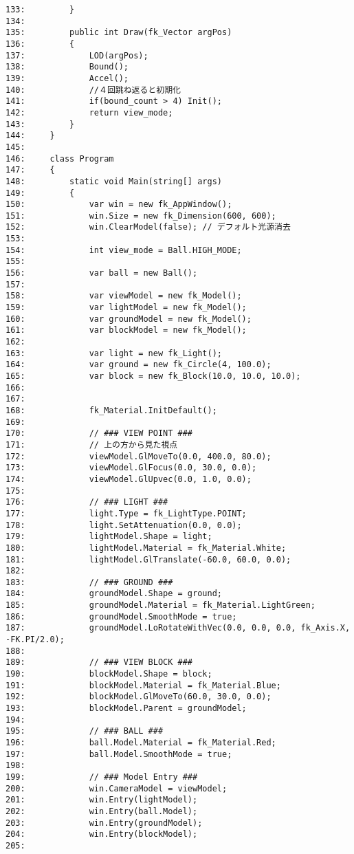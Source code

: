 \begin{breakbox}
\begin{small}
\begin{verbatim}
133:         }
134: 
135:         public int Draw(fk_Vector argPos)
136:         {
137:             LOD(argPos);
138:             Bound();
139:             Accel();
140:             //４回跳ね返ると初期化
141:             if(bound_count > 4) Init();
142:             return view_mode;
143:         }
144:     }
145: 
146:     class Program
147:     {
148:         static void Main(string[] args)
149:         {
150:             var win = new fk_AppWindow();
151:             win.Size = new fk_Dimension(600, 600);
152:             win.ClearModel(false); // デフォルト光源消去
153: 
154:             int view_mode = Ball.HIGH_MODE;
155:     
156:             var ball = new Ball();
157:             
158:             var viewModel = new fk_Model();
159:             var lightModel = new fk_Model();
160:             var groundModel = new fk_Model();
161:             var blockModel = new fk_Model();
162: 
163:             var light = new fk_Light();
164:             var ground = new fk_Circle(4, 100.0);
165:             var block = new fk_Block(10.0, 10.0, 10.0);
166: 
167: 
168:             fk_Material.InitDefault();
169: 
170:             // ### VIEW POINT ###
171:             // 上の方から見た視点
172:             viewModel.GlMoveTo(0.0, 400.0, 80.0);
173:             viewModel.GlFocus(0.0, 30.0, 0.0);
174:             viewModel.GlUpvec(0.0, 1.0, 0.0);
175: 
176:             // ### LIGHT ###
177:             light.Type = fk_LightType.POINT;
178:             light.SetAttenuation(0.0, 0.0);
179:             lightModel.Shape = light;
180:             lightModel.Material = fk_Material.White;
181:             lightModel.GlTranslate(-60.0, 60.0, 0.0);
182: 
183:             // ### GROUND ###
184:             groundModel.Shape = ground;
185:             groundModel.Material = fk_Material.LightGreen;
186:             groundModel.SmoothMode = true;
187:             groundModel.LoRotateWithVec(0.0, 0.0, 0.0, fk_Axis.X, -FK.PI/2.0);
188: 
189:             // ### VIEW BLOCK ###
190:             blockModel.Shape = block;
191:             blockModel.Material = fk_Material.Blue;
192:             blockModel.GlMoveTo(60.0, 30.0, 0.0);
193:             blockModel.Parent = groundModel;
194: 
195:             // ### BALL ###
196:             ball.Model.Material = fk_Material.Red;
197:             ball.Model.SmoothMode = true;
198:     
199:             // ### Model Entry ###
200:             win.CameraModel = viewModel;
201:             win.Entry(lightModel);
202:             win.Entry(ball.Model);
203:             win.Entry(groundModel);
204:             win.Entry(blockModel); 
205: 

\end{verbatim}
\end{small}
\end{breakbox}
